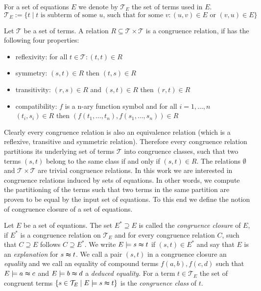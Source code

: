 \noindent For a set of equations $E$ we denote by $\mathcal{T}_E$ the set of terms used in $E$.
$$\mathcal{T}_E := \{t \mid t \text{ is subterm of some } u \text{, such that for some } v: (u,v) \in E \text{ or } (v,u) \in E\}$$

\begin{definition}

Let $\mathcal{T}$ be a set of terms.
A relation $R \subseteq \mathcal{T} \times \mathcal{T}$ is a congruence relation, if has the following four properties:
\begin{itemize}
	\item reflexivity: for all $t \in \mathcal{T}: (t,t) \in R$
	\item symmetry: $(s,t) \in R$ then $(t,s) \in R$
	\item transitivity: $(r,s) \in R$ and $(s,t) \in R$ then $(r,t) \in R$
	\item compatibility: $f$ is a n-ary function symbol and for all $i = 1,\ldots,n$ $(t_i,s_i) \in R$ then $(f(t_1,\ldots,t_n),f(s_1,\ldots,s_n)) \in R$
\end{itemize}

\end{definition}

Clearly every congruence relation is also an equivalence relation (which is a reflexive, transitive and symmetric relation).
Therefore every congruence relation partitions its underlying set of terms $\mathcal{T}$ into congruence classes, such that two terms $(s,t)$ belong to the same class if and only if $(s,t) \in R$.
The relations $\emptyset$ and $\mathcal{T} \times \mathcal{T}$ are trivial congruence relations.
In this work we are interested in congruence relations induced by sets of equations.
In other words, we compute the partitioning of the terms such that two terms in the same partition are proven to be equal by the input set of equations.
To this end we define the notion of congruence closure of a set of equations.

\begin{definition}

Let $E$ be a set of equations.
The set $E^* \supseteq E$ is called the \emph{congruence closure} of $E$, 
if $E^*$ is a congruence relation on $\mathcal{T}_E$ and for every congruence relation $C$, such that $C \supseteq E$ follows $C \supseteq E^*$.
We write $E \models s \thickapprox t$ if $(s,t) \in E^*$ and say that $E$ is an \emph{explanation} for $s \thickapprox t$.
We call a pair $(s,t)$ in a congruence closure an \emph{equality} and we call an equality of compound terms $f(a,b),f(c,d)$ such that $E \models a \thickapprox c$ and $E \models b \thickapprox d$ a \emph{deduced equality}.
For a term $t \in \mathcal{T}_E$ the set of congruent terms $\{s \in \mathcal{T}_E \mid E \models s \thickapprox t\}$ is the \emph{congruence class} of $t$.

\end{definition}

